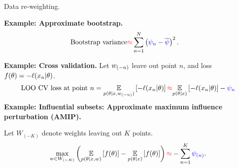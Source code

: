 
\begin{frame}[t]{Data re-weighting.}

    

    \textbf{Example: Approximate bootstrap.}
    \begin{align*}
    \textrm{Bootstrap variance} \textcolor{red}{\approx}{}&
    \sum_{n=1}^N \left(\textcolor{blue}{\psi_n} - \overline{\textcolor{blue}{\psi}}\right)^2.
    \end{align*}

    
    \pause
    \textbf{Example: Cross validation.} 
    Let $w_{(-n)}$ leave out point $n$, and loss
    $f(\theta) = -\ell(x_n \vert \theta)$.
    \begin{align*}
    \textrm{LOO CV loss at point }n =
        \underset{p(\theta \vert x, w_{(-n)})}{\mathbb{E}}\left[-\ell(x_n \vert \theta)\right]
    \textcolor{red}{\approx} 
        \underset{p(\theta \vert x)}{\mathbb{E}}\left[-\ell(x_n \vert \theta)\right] - \textcolor{blue}{\psi_{n}}
    \end{align*}
    \pause
    \textbf{Example: Influential subsets:
    Approximate maximum influence perturbation (AMIP).}
    
    Let $W_{(-K)}$ denote weights leaving out $K$ points.
    \begin{align*}
    \max_{w \in W_{(-K)}} \left(
    \underset{p(\theta \vert x, w)}{\mathbb{E}}\left[f(\theta)\right] -
    \underset{p(\theta \vert x)}{\mathbb{E}}\left[f(\theta)\right]
    \right) \textcolor{red}{\approx} - \sum_{n=1}^K \textcolor{blue}{\psi_{(n)}}.
    \end{align*}
    
    \pause
    
    
\end{frame}
    

    

